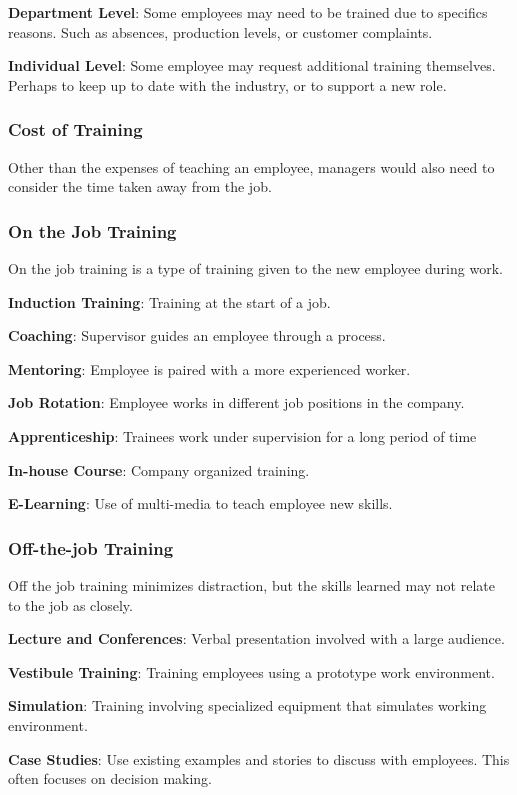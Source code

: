 \documentclass{standalone}
\begin{document}
\textbf{Department Level}: Some employees may need to be trained due to specifics reasons. 
Such as absences, production levels, or customer complaints.

\textbf{Individual Level}: Some employee may request additional training themselves.
Perhaps to keep up to date with the industry, or to support a new role.

\subsubsection{Cost of Training}
Other than the expenses of teaching an employee, managers would also need to consider the time taken away from the job.

\subsubsection{On the Job Training}
On the job training is a type of training given to the new employee during work.

\textbf{Induction Training}: Training at the start of a job.

\textbf{Coaching}: Supervisor guides an employee through a process.

\textbf{Mentoring}: Employee is paired with a more experienced worker.

\textbf{Job Rotation}: Employee works in different job positions in the company.

\textbf{Apprenticeship}: Trainees work under supervision for a long period of time

\textbf{In-house Course}: Company organized training.

\textbf{E-Learning}: Use of multi-media to teach employee new skills.

\subsubsection{Off-the-job Training}
Off the job training minimizes distraction, but the skills learned may not relate to the job as closely.

\textbf{Lecture and Conferences}: Verbal presentation involved with a large audience.

\textbf{Vestibule Training}: Training employees using a prototype work environment.

\textbf{Simulation}: Training involving specialized equipment that simulates working environment.

\textbf{Case Studies}: Use existing examples and stories to discuss with employees.
This often focuses on decision making.
\end{document}
